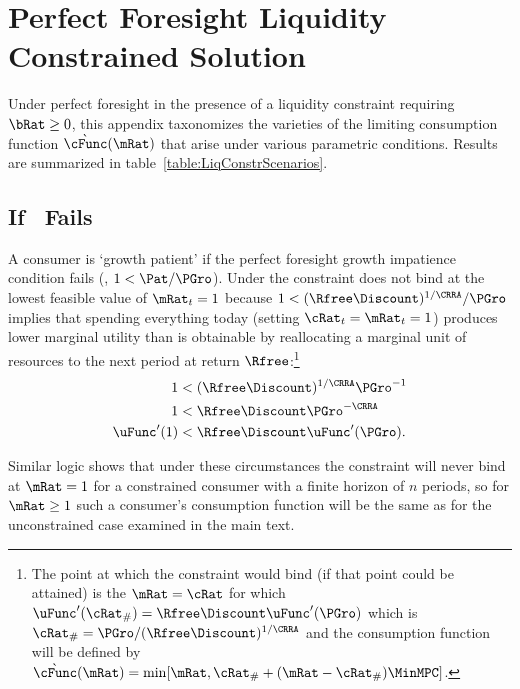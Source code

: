 \documentclass[\econtexRoot/BufferStockTheory.tex]{subfiles}
\begin{document}
\let\TableWidth\relax
\newlength\TableWidth
\providecommand{\FigsRawApndx}{\econtexRoot/Code/Mathematica/Results/BufferStockTheory/Figures}

\section{Perfect Foresight Liquidity Constrained Solution}\label{sec:ApndxLiqConstr}

  Under perfect foresight in the presence of a liquidity constraint requiring $\bRat
  \geq 0$, this appendix taxonomizes the varieties of the limiting
  consumption function $\grave{\cFunc}(\mRat)$ that arise under various parametric conditions.  Results are summarized in table~\ref{table:LiqConstrScenarios}.



\subsection{If \PFGIC~Fails}

A consumer is `growth patient' if the perfect foresight growth
impatience condition fails (\cncl{\PFGIC}, $1 < \Pat/\PGro$).  Under
\cncl{\PFGIC} the constraint does not bind at the lowest feasible value of $\mRat_{t}=1$ because
$1 < (\Rfree\Discount)^{1/\CRRA}/\PGro$ implies that spending
everything today (setting $\cRat_{t}=\mRat_{t}=1$) produces lower
marginal utility than is obtainable by reallocating a marginal unit of
resources to the next period at return $\Rfree$:\footnote{The point at
  which the constraint would bind (if that point could be attained) is
  the $\mRat=\cRat$ for which $\uFunc^{\prime}(\cRat_{\#}) = \Rfree
  \Discount \uFunc^{\prime}(\PGro)$ which is $\cRat_{\#} =
  \PGro/(\Rfree \Discount)^{1/\CRRA}$ and the consumption function
  will be defined by
  $\grave{\cFunc}(\mRat)=\min[\mRat,\cRat_{\#}+(\mRat-\cRat_{\#})\MinMPC
  ]$.}
\begin{align}
1  & < (\Rfree \Discount)^{1/\CRRA}\PGro^{-1}    
\\ 1  & < \Rfree \Discount \PGro^{-\CRRA}
\\  \uFunc^{\prime}(1)  & < \Rfree \Discount \uFunc^{\prime}(\PGro)   \label{eq:EulerPFGICFailsEnd}.
\end{align}

Similar logic shows that under these circumstances the constraint will
never bind at $\mRat=1$ for a constrained consumer with a finite horizon of $n$
periods, so for $\mRat \geq 1$ such a consumer's consumption function will be the same as for the
unconstrained case examined in the main text.
\end{document}
